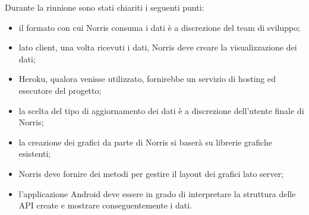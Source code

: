 Durante la riunione sono stati chiariti i seguenti punti:
\begin{itemize}
\item il formato con cui Norris consuma i dati è a discrezione del team di sviluppo;
\item lato client, una volta ricevuti i dati, Norris deve creare la visualizzazione dei dati;
\item Heroku, qualora venisse utilizzato, fornirebbe un servizio di hosting ed esecutore del progetto;
\item la scelta del tipo di aggiornamento dei dati è a discrezione dell'utente finale di Norris;
\item la creazione dei grafici da parte di Norris si baserà su librerie grafiche esistenti;
\item Norris deve fornire dei metodi per gestire il layout dei grafici lato server;
\item l'applicazione Android deve essere in grado di interpretare la struttura delle API create e mostrare conseguentemente i dati.
\end{itemize}